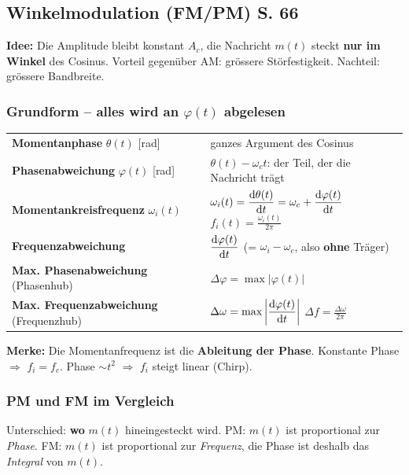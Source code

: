 \subsection{Winkelmodulation (FM/PM) S. 66}
\textbf{Idee:} Die Amplitude bleibt konstant $A_c$, die Nachricht $m(t)$ steckt \textbf{nur im Winkel} des Cosinus. Vorteil gegenüber AM: grössere Störfestigkeit. Nachteil: grössere Bandbreite.

\subsubsection{Grundform -- alles wird an $\varphi(t)$ abgelesen}

\begin{tabularx}{\linewidth}{>{\raggedright\arraybackslash}p{.30\linewidth} >{\raggedright\arraybackslash}X}
	\textbf{Momentanphase} $\theta(t)$ [rad] & ganzes Argument des Cosinus \\
	\textbf{Phasenabweichung} $\varphi(t)$ [rad] & $\theta(t) - \omega_c t$: der Teil, der die Nachricht trägt \\
	\textbf{Momentankreisfrequenz} $\omega_i(t)$ & $\displaystyle \omega_i(t) = \frac{\mathop{}\!\mathrm{d}\theta(t)}{\mathop{}\!\mathrm{d} t} = \omega_c + \frac{\mathop{}\!\mathrm{d}\varphi(t)}{\mathop{}\!\mathrm{d} t}$ \qquad $\displaystyle f_i(t) = \frac{\omega_i(t)}{2\pi}$ \\[8pt]
	\textbf{Frequenzabweichung} & $\displaystyle \frac{\mathop{}\!\mathrm{d}\varphi(t)}{\mathop{}\!\mathrm{d} t}$ \quad (= $\omega_i - \omega_c$, also \textbf{ohne} Träger) \\[8pt]
	\textbf{Max. Phasenabweichung} (Phasenhub) & $\displaystyle \Delta\varphi = \max\big|\varphi(t)\big|$ \quad [rad] \\[6pt]
	\textbf{Max. Frequenzabweichung} (Frequenzhub) & $\displaystyle \Delta\omega = \max\left|\frac{\mathop{}\!\mathrm{d}\varphi(t)}{\mathop{}\!\mathrm{d} t}\right|$ \quad [rad/s] \qquad $\displaystyle \Delta f = \frac{\Delta\omega}{2\pi}$ \quad [Hz] \\
\end{tabularx}

\vspace{.2cm}
\textbf{Merke:} Die Momentanfrequenz ist die \textbf{Ableitung der Phase}. Konstante Phase $\Rightarrow$ $f_i = f_c$. Phase $\sim t^2$ $\Rightarrow$ $f_i$ steigt linear (Chirp).

\subsubsection{PM und FM im Vergleich}
Unterschied: \textbf{wo} $m(t)$ hineingesteckt wird. PM: $m(t)$ ist proportional zur \emph{Phase}. FM: $m(t)$ ist proportional zur \emph{Frequenz}, die Phase ist deshalb das \emph{Integral} von $m(t)$.

